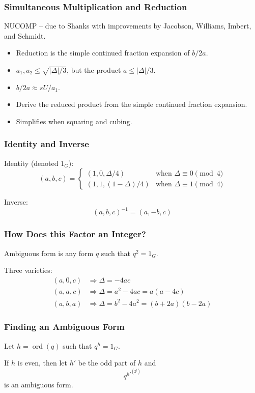 \documentclass{beamer}
\DeclareMathOperator{\ord}{ord}
\begin{document}
\begin{frame}
\frametitle{Simultaneous Multiplication and Reduction}
NUCOMP -- due to Shanks with improvements by Jacobson, Williams, Imbert, and Schmidt.
\begin{itemize}
\item Reduction is the simple continued fraction expansion of $b/2a$.
\item $a_1, a_2 \le \sqrt{|\Delta|/3}$, but the product $a \le |\Delta|/3$.
\item $b/2a \approx sU/a_1$.
\item Derive the reduced product from the simple continued fraction expansion.
\item Simplifies when squaring and cubing.
\end{itemize}
\end{frame}

\begin{frame}
\frametitle{Identity and Inverse}
Identity (denoted $1_G$):
\[
(a, b, c) = \begin{cases}
  (1, 0, \Delta/4) & \textrm{when } \Delta \equiv 0 \pmod 4 \\
  (1, 1, (1-\Delta)/4) & \textrm{when } \Delta \equiv 1 \pmod 4
\end{cases}
\]

\bigbreak
Inverse:
\[
(a, b, c)^{-1} = (a, -b, c)
\]
\end{frame}

\begin{frame}
\frametitle{How Does this Factor an Integer?}
Ambiguous form is any form $q$ such that $q^2 = 1_G$.

\bigbreak
Three varieties:
\begin{align*}
(a, 0, c) &\Rightarrow \Delta = -4ac \\
(a, a, c) &\Rightarrow \Delta = a^2 - 4ac = a(a - 4c) \\
(a, b, a) &\Rightarrow \Delta = b^2 - 4a^2 = (b+2a)(b-2a)
\end{align*}
\end{frame}

\begin{frame}
\frametitle{Finding an Ambiguous Form}
Let $h = \ord(q)$ such that $q^h = 1_G$.

\bigbreak
If $h$ is even, then let $h'$ be the odd part of $h$ and
\[
	q^{h'}^{\left(2^j\right)}
\]
is an ambiguous form.
\end{frame}
\end{document}
